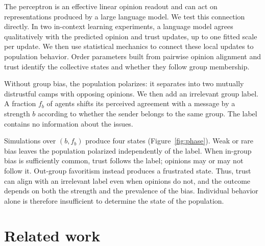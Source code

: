 \documentclass{article}
\newcommand{\fb}{f_{b}}
\begin{document}
The perceptron is an effective linear opinion readout and can act on representations
produced by a large language model. We test this connection directly. In two
in-context learning experiments, a language model agrees qualitatively with the
predicted opinion and trust updates, up to one fitted scale per update. We then use
statistical mechanics to connect these local updates to population behavior. Order
parameters built from pairwise opinion alignment and trust identify the collective
states and whether they follow group membership.

Without group bias, the population polarizes: it separates into two mutually distrustful camps
with opposing opinions. We then add an irrelevant group label. A fraction
$\fb$ of agents shifts its perceived agreement with a message by a strength $b$
according to whether the sender belongs to the same group. The label contains no
information about the issues.

Simulations over $(b,\fb)$ produce four states (Figure~\ref{fig:phase}). Weak or
rare bias leaves the population polarized independently of the label. When
in-group bias is sufficiently common, trust follows the label; opinions may or may
not follow it. Out-group favoritism instead produces a frustrated state. Thus,
trust can align with an irrelevant label even when opinions do not, and the outcome
depends on both the strength and the prevalence of the bias. Individual behavior
alone is therefore insufficient to determine the state of the population.


\section{Related work}
\label{sec:related}
\end{document}
